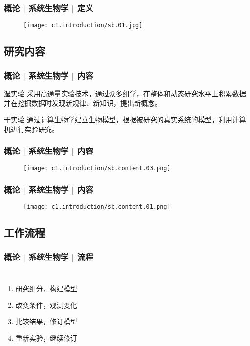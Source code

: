 \begin{frame}
  \frametitle{概论 | 系统生物学 | 定义}
  \begin{figure}
    \centering
    \texttt{[image: c1.introduction/sb.01.jpg]}
  \end{figure}
\end{frame}

\subsection{研究内容}
\begin{frame}
  \frametitle{概论 | 系统生物学 | 内容}
  \begin{block}{湿实验}
采用高通量实验技术，通过众多组学，在整体和动态研究水平上积累数据并在挖掘数据时发现新规律、新知识，提出新概念。
  \end{block}
  \pause
  \begin{block}{干实验}
通过计算生物学建立生物模型，根据被研究的真实系统的模型，利用计算机进行实验研究。
  \end{block}
\end{frame}

\begin{frame}
  \frametitle{概论 | 系统生物学 | 内容}
  \begin{figure}
    \centering
    \texttt{[image: c1.introduction/sb.content.03.png]}
  \end{figure}
\end{frame}

\begin{frame}
  \frametitle{概论 | 系统生物学 | 内容}
  \begin{figure}
    \centering
    \texttt{[image: c1.introduction/sb.content.01.png]}
  \end{figure}
\end{frame}

\subsection{工作流程}
\begin{frame}
  \frametitle{概论 | 系统生物学 | 流程}
  \begin{columns}
  \begin{enumerate}
    \item 研究组分，构建模型
    \item 改变条件，观测变化
    \item 比较结果，修订模型
    \item 重新实验，继续修订
  \end{enumerate}
  \begin{figure}
    \centering
  \end{figure}
  \end{columns}
\end{frame}

